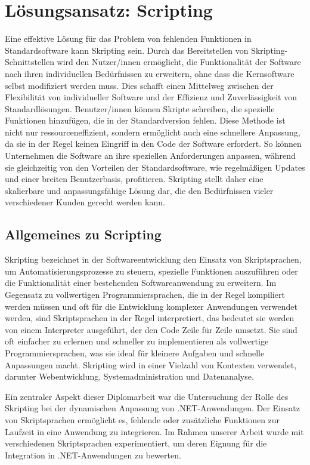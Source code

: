 \newpage
\section{Lösungsansatz: Scripting}

Eine effektive Lösung für das Problem von fehlenden Funktionen in Standardsoftware 
kann Skripting sein. Durch das Bereitstellen von Skripting-Schnittstellen wird den 
Nutzer/innen ermöglicht, die Funktionalität der Software nach ihren individuellen Bedürfnissen 
zu erweitern, ohne dass die Kernsoftware selbst modifiziert werden muss. 
Dies schafft einen Mittelweg zwischen der Flexibilität von individueller Software 
und der Effizienz und Zuverlässigkeit von Standardlösungen. Benutzer/innen können 
Skripte schreiben, die spezielle Funktionen hinzufügen, die in der Standardversion fehlen. 
Diese Methode ist nicht nur ressourceneffizient, sondern ermöglicht auch eine schnellere 
Anpassung, da sie in der Regel keinen Eingriff in den Code der Software erfordert. 
So können Unternehmen die Software an ihre speziellen Anforderungen anpassen, 
während sie gleichzeitig von den Vorteilen der Standardsoftware, wie regelmäßigen 
Updates und einer breiten Benutzerbasis, profitieren. Skripting stellt daher eine 
skalierbare und anpassungsfähige Lösung dar, die den Bedürfnissen vieler verschiedener 
Kunden gerecht werden kann.

\subsection*{Allgemeines zu Scripting}

Skripting bezeichnet in der Softwareentwicklung den Einsatz von Skriptsprachen, 
um Automatisierungsprozesse zu steuern, spezielle Funktionen auszuführen oder die 
Funktionalität einer bestehenden Softwareanwendung zu erweitern. 
Im Gegensatz zu vollwertigen Programmiersprachen, die in der Regel kompiliert werden 
müssen und oft für die Entwicklung komplexer Anwendungen verwendet werden, 
sind Skriptsprachen in der Regel interpretiert, das bedeutet sie werden von einem 
Interpreter ausgeführt, der den Code Zeile für Zeile umsetzt. Sie sind oft einfacher zu 
erlernen und schneller zu implementieren als vollwertige Programmiersprachen, was sie ideal 
für kleinere Aufgaben und schnelle Anpassungen macht. Skripting wird in einer Vielzahl von 
Kontexten verwendet, darunter Webentwicklung, Systemadministration und Datenanalyse.

Ein zentraler Aspekt dieser Diplomarbeit war die Untersuchung der Rolle des Skripting 
bei der dynamischen Anpassung von .NET-Anwendungen. Der Einsatz von Skriptsprachen ermöglicht es, 
fehlende oder zusätzliche Funktionen zur Laufzeit in eine Anwendung zu integrieren. 
Im Rahmen unserer Arbeit wurde mit verschiedenen Skriptsprachen experimentiert, um deren 
Eignung für die Integration in .NET-Anwendungen zu bewerten.

